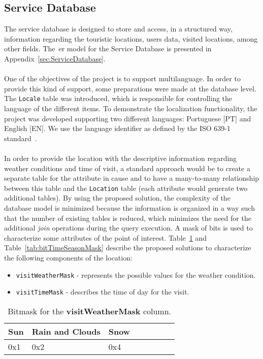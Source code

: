 \subsection{Service Database}
\label{sec:ServiceDataBaseModel}
The service database is designed to store and access, in a structured way, information regarding the touristic locations, users data, visited locations, among other fields. The~\gls{er} model for the Service Database is presented in Appendix~\ref{sec:ServiceDatabase}.\\
\\
One of the objectives of the project is to support multilanguage. In order to provide this kind of support, some preparations were made at the database level. The \verb"Locale" table was introduced, which is responsible for controlling the language of the different items. To demonstrate the localization functionality, the project was developed supporting two different languages: Portuguese [PT] and English [EN]. We use the language identifier as defined by the ISO 639-1 standard~\cite{rfcLanguageCode}.\\
\\
In order to provide the location with the descriptive information regarding weather conditions and time of visit, a standard approach would be to create a separate table for the attribute in cause and to have a many-to-many relationship between this table and the \verb"Location" table (each attribute would generate two additional tables). By using the proposed solution, the complexity of the database model is minimized because the information is organized in a way such that the number of existing tables is reduced, which minimizes the need for the additional \emph{join} operations during the query execution. A mask of bits is used to characterize some attributes of the point of interest. Table~\ref{tab:bitMaskWeatherColumns} and Table~\ref{tab:bitTimeSeasonMask} describe the proposed solutions to characterize the following components of the location:
\begin{itemize}
\item \verb"visitWeatherMask" - represents the possible values for the weather condition.
\item \verb"visitTimeMask" - describes the time of day for the visit.
\end{itemize}
\begin{center}
\begin{table}
	\centering
    \caption{Bitmask for the \textbf{visitWeatherMask} column.}
    \label{tab:bitMaskWeatherColumns}
   \begin{tabular}{| >{\centering\arraybackslash}m{2.6cm} | >{\centering\arraybackslash}m{2.6cm} |>{\centering\arraybackslash}m{2.6cm} |>{\centering\arraybackslash}m{2.6cm} |>{\centering\arraybackslash}m{2.6cm} |>{\centering\arraybackslash}m{2.6cm} |>{\centering\arraybackslash}m{2.6cm} |>{\centering\arraybackslash}m{2.6cm} |}
    \hline
	Sun & Rain and Clouds & Snow
    \\ \hline    
	0x1 & 0x2 & 0x4
    \\ \hline
    \end{tabular}
    \end{table}
\end{center}
